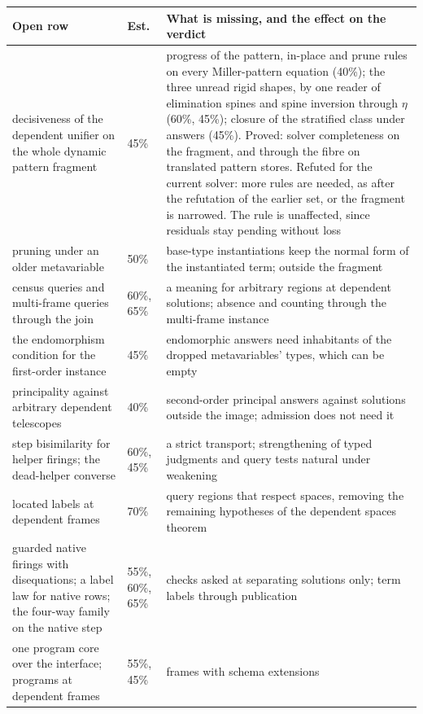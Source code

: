 \documentclass[11pt]{article}
\theoremstyle{remark}
\begin{document}
\begin{center}\small
\begin{longtable}{@{}L{0.33\textwidth}L{0.09\textwidth}L{0.52\textwidth}@{}}
\toprule
\textbf{Open row} & \textbf{Est.} & \textbf{What is missing, and the effect on the verdict} \\
\midrule
\endhead
decisiveness of the dependent unifier on the whole dynamic pattern fragment & 45\% & progress of the pattern, in-place and prune rules on every Miller-pattern equation (40\%); the three unread rigid shapes, by one reader of elimination spines and spine inversion through $\eta$ (60\%, 45\%); closure of the stratified class under answers (45\%). Proved: solver completeness on the fragment, and through the fibre on translated pattern stores. Refuted for the current solver: more rules are needed, as after the refutation of the earlier set, or the fragment is narrowed. The rule is unaffected, since residuals stay pending without loss \\
pruning under an older metavariable & 50\% & base-type instantiations keep the normal form of the instantiated term; outside the fragment \\
census queries and multi-frame queries through the join & 60\%, 65\% & a meaning for arbitrary regions at dependent solutions; absence and counting through the multi-frame instance \\
the endomorphism condition for the first-order instance & 45\% & endomorphic answers need inhabitants of the dropped metavariables' types, which can be empty \\
principality against arbitrary dependent telescopes & 40\% & second-order principal answers against solutions outside the image; admission does not need it \\
step bisimilarity for helper firings; the dead-helper converse & 60\%, 45\% & a strict transport; strengthening of typed judgments and query tests natural under weakening \\
located labels at dependent frames & 70\% & query regions that respect spaces, removing the remaining hypotheses of the dependent spaces theorem \\
guarded native firings with disequations; a label law for native rows; the four-way family on the native step & 55\%, 60\%, 65\% & checks asked at separating solutions only; term labels through publication \\
one program core over the interface; programs at dependent frames & 55\%, 45\% & frames with schema extensions \\

\end{longtable}
\end{center}
\end{document}
